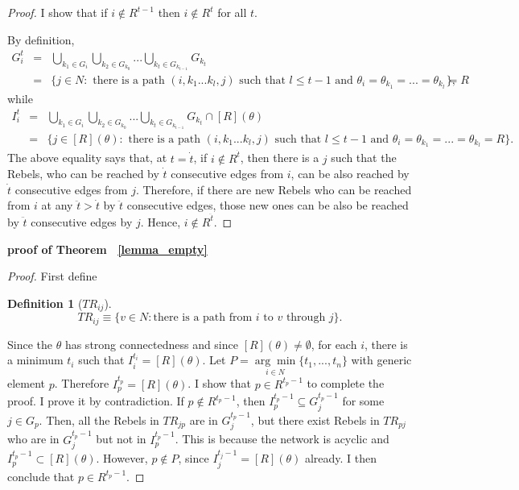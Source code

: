 \documentclass[12pt,letter]{article}
\newtheorem*{lemma*}{Lemma}
\newtheorem{definition}{Definition}[section]
\theoremstyle{definition}
\theoremstyle{remark}
\theoremstyle{claim}
\begin{document}
\begin{proof}
I show that if $i\notin R^{t-1}$ then $i\notin R^t$ for all $t$. 

By definition, 
\begin{eqnarray*}
G^t_i & = & \bigcup_{k_1\in G_i}\bigcup_{k_2\in G_{k_0}}...\bigcup_{k_{t}\in G_{k_{t-1}}}G_{k_{t}}\\
&= & \{j\in N: \text{ there is a path $(i,k_1...k_{l},j)$ such that $l\leq t-1$ and $\theta_i=\theta_{k_1}=...=\theta_{k_l}=R$}\},
\end{eqnarray*}
while
\begin{eqnarray*}
I^t_i & = & \bigcup_{k_1\in G_i}\bigcup_{k_2\in G_{k_0}}...\bigcup_{k_{t}\in G_{k_{t-1}}}G_{k_{t}}\cap [R](\theta)\\
&= & \{j\in [R](\theta): \text{ there is a path $(i,k_1...k_{l},j)$ such that $l\leq t-1$ and $\theta_i=\theta_{k_1}=...=\theta_{k_l}=R$}\}.
\end{eqnarray*}
The above equality says that, at $t=\dot{t}$, if $i\notin R^{\dot{t}}$, then there is a $j$ such that the Rebels, who can be reached by $\dot{t}$ consecutive edges from $i$, can be also reached by $\dot{t}$ consecutive edges from $j$. Therefore, if there are new Rebels who can be reached from $i$ at any $\ddot{t}>\dot{t}$ by $\ddot{t}$ consecutive edges, those new ones can be also be reached by $\ddot{t}$ consecutive edges by $j$. Hence, $i\notin R^{\ddot{t}}$. 
\end{proof}



%
\bigskip
\noindent\textbf{proof of Theorem ~\ref{lemma_empty}}
\begin{proof}
First define
\begin{definition}[$TR_{ij}$]
\[TR_{ij}\equiv \{v\in N:\text{there is a path from $i$ to $v$ through $j$}\}.\]
\end{definition}


Since the $\theta$ has strong connectedness and since $[R](\theta)\neq \emptyset$, for each $i$, there is a minimum $t_i$ such that $I^{t_i}_i=[R](\theta)$. Let $P=\underset{i\in N}{\arg\min}\{t_1,...,t_n\}$ with generic element $p$. Therefore $I^{t_p}_p=[R](\theta)$. I show that $p\in R^{t_p-1}$ to complete the proof. I prove it by contradiction. If $p\notin R^{t_p-1}$, then $I^{t_p-1}_p\subseteq G^{t_p-1}_j$ for some $j\in G_p$. Then, all the Rebels in $TR_{jp}$ are in $G^{t_p-1}_j$, but there exist Rebels in $TR_{pj}$ who are in $G^{t_p-1}_j$ but not in $I^{t_p-1}_p$. This is because the network is acyclic and $I^{t_p-1}_p\subset [R](\theta)$. However, $p\notin P$, since $I^{t_j-1}_j=[R](\theta)$ already. I then conclude that $p\in R^{t_p-1}$.

\end{proof}
\end{document}
